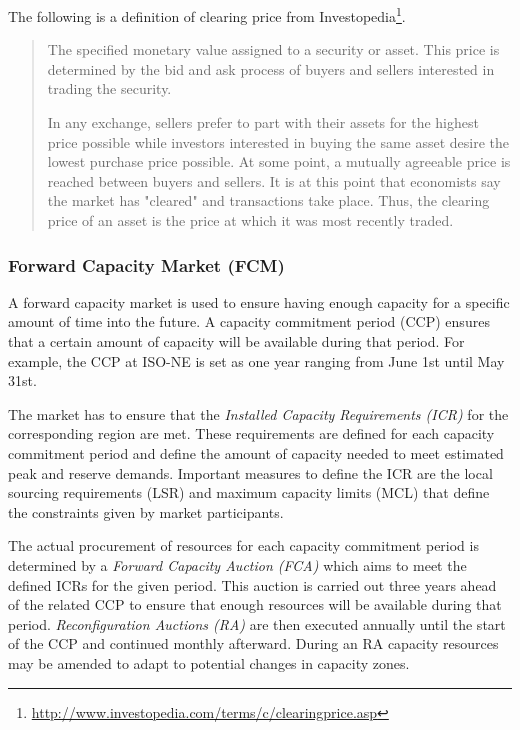 The following is a definition of clearing price from Investopedia\footnote{\url{http://www.investopedia.com/terms/c/clearingprice.asp}}. 

\begin{quote}
The specified monetary value assigned to a security or asset. This price is determined by the bid and ask process of buyers and sellers interested in trading the security.

In any exchange, sellers prefer to part with their assets for the highest price possible while investors interested in buying the same asset desire the lowest purchase price possible. At some point, a mutually agreeable price is reached between buyers and sellers. It is at this point that economists say the market has "cleared" and transactions take place. Thus, the clearing price of an asset is the price at which it was most recently traded.
\end{quote}

\subsubsection{Forward Capacity Market (FCM)}

A forward capacity market is used to ensure having enough capacity for a specific amount of time into the future. A capacity commitment period (CCP) ensures that a certain amount of capacity will be available during that period. For example, the CCP at ISO-NE is set as one year ranging from June 1st until May 31st. 

The market has to ensure that the \emph{Installed Capacity Requirements (ICR)} for the corresponding region are met. These requirements are defined for each capacity commitment period and define the amount of capacity needed to meet estimated peak and reserve demands. Important measures to define the ICR are the local sourcing requirements (LSR) and maximum capacity limits (MCL) that define the constraints given by market participants. %

The actual procurement of resources for each capacity commitment period is determined by a \emph{Forward Capacity Auction (FCA)} which aims to meet the defined ICRs for the given period.
This auction is carried out three years ahead of the related CCP to ensure that enough resources will be available during that period. \emph{Reconfiguration Auctions (RA)} are then executed annually until the start of the CCP and continued monthly afterward. During an RA capacity resources may be amended to adapt to potential changes in capacity zones. 

